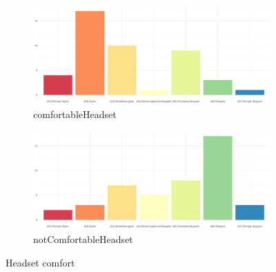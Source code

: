 \begin{figure}
	\centering
	\begin{subfigure}{0.48\textwidth}
		\includegraphics[width=\textwidth]{./_StudyResults/comfortableHeadset}
		\caption{comfortableHeadset}
		\label{fig:comfortableHeadset}
	\end{subfigure}%
	\hfill
	\begin{subfigure}{0.48\textwidth}
		\includegraphics[width=\textwidth]{./_StudyResults/notComfortableHeadset}
		\caption{notComfortableHeadset}
		\label{fig:notComfortableHeadset}
	\end{subfigure}
	\caption{Headset comfort} %
\end{figure}

